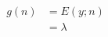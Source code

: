 \begin{answer}
    $$
    \begin{aligned}
        g(n) &= E(y;n)\\
        &= \lambda
    \end{aligned}
    $$
\end{answer}
